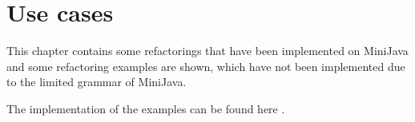 \section{Use cases}

This chapter contains some refactorings that have been implemented on MiniJava and some refactoring examples are shown, 
which have not been implemented due to the limited grammar of MiniJava.

The implementation of the examples can be found here \cite{gp-modifiable-ast examples}.





